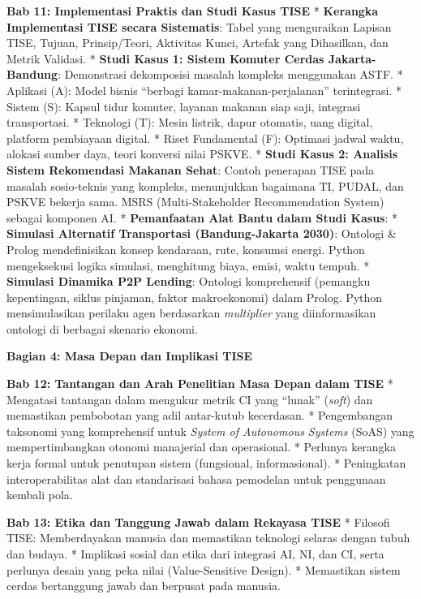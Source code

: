 \documentclass[
  letterpaper,
  DIV=11,
  numbers=noendperiod]{scrreprt}
\begin{document}
\textbf{Bab 11: Implementasi Praktis dan Studi Kasus TISE} *
\textbf{Kerangka Implementasi TISE secara Sistematis}: Tabel yang
menguraikan Lapisan TISE, Tujuan, Prinsip/Teori, Aktivitas Kunci,
Artefak yang Dihasilkan, dan Metrik Validasi. * \textbf{Studi Kasus 1:
Sistem Komuter Cerdas Jakarta-Bandung}: Demonstrasi dekomposisi masalah
kompleks menggunakan ASTF. * Aplikasi (A): Model bisnis ``berbagi
kamar-makanan-perjalanan'' terintegrasi. * Sistem (S): Kapsul tidur
komuter, layanan makanan siap saji, integrasi transportasi. * Teknologi
(T): Mesin listrik, dapur otomatis, uang digital, platform pembiayaan
digital. * Riset Fundamental (F): Optimasi jadwal waktu, alokasi sumber
daya, teori konversi nilai PSKVE. * \textbf{Studi Kasus 2: Analisis
Sistem Rekomendasi Makanan Sehat}: Contoh penerapan TISE pada masalah
sosio-teknis yang kompleks, menunjukkan bagaimana TI, PUDAL, dan PSKVE
bekerja sama. MSRS (Multi-Stakeholder Recommendation System) sebagai
komponen AI. * \textbf{Pemanfaatan Alat Bantu dalam Studi Kasus}: *
\textbf{Simulasi Alternatif Transportasi (Bandung-Jakarta 2030)}:
Ontologi \& Prolog mendefinisikan konsep kendaraan, rute, konsumsi
energi. Python mengeksekusi logika simulasi, menghitung biaya, emisi,
waktu tempuh. * \textbf{Simulasi Dinamika P2P Lending}: Ontologi
komprehensif (pemangku kepentingan, siklus pinjaman, faktor
makroekonomi) dalam Prolog. Python mensimulasikan perilaku agen
berdasarkan \emph{multiplier} yang diinformasikan ontologi di berbagai
skenario ekonomi.

\textbf{Bagian 4: Masa Depan dan Implikasi TISE}

\textbf{Bab 12: Tantangan dan Arah Penelitian Masa Depan dalam TISE} *
Mengatasi tantangan dalam mengukur metrik CI yang ``lunak''
(\emph{soft}) dan memastikan pembobotan yang adil antar-kutub
kecerdasan. * Pengembangan taksonomi yang komprehensif untuk
\emph{System of Autonomous Systems} (SoAS) yang mempertimbangkan otonomi
manajerial dan operasional. * Perlunya kerangka kerja formal untuk
penutupan sistem (fungsional, informasional). * Peningkatan
interoperabilitas alat dan standarisasi bahasa pemodelan untuk
penggunaan kembali pola.

\textbf{Bab 13: Etika dan Tanggung Jawab dalam Rekayasa TISE} * Filosofi
TISE: Memberdayakan manusia dan memastikan teknologi selaras dengan
tubuh dan budaya. * Implikasi sosial dan etika dari integrasi AI, NI,
dan CI, serta perlunya desain yang peka nilai (Value-Sensitive Design).
* Memastikan sistem cerdas bertanggung jawab dan berpusat pada manusia.
\end{document}
